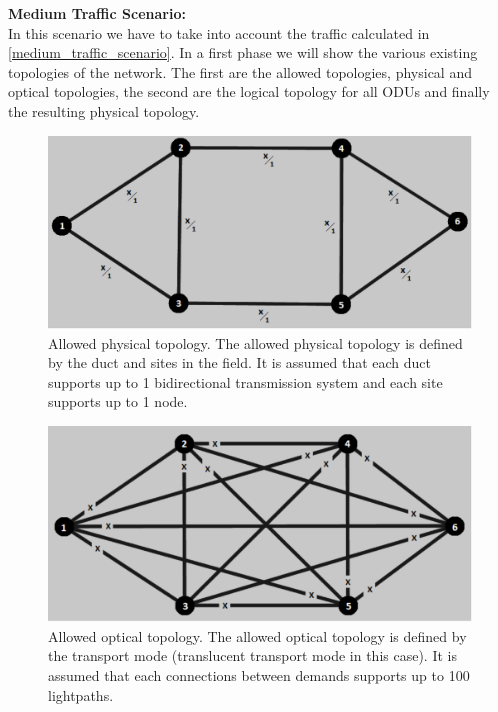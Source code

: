 \noindent
\textbf{Medium Traffic Scenario:}\\

In this scenario we have to take into account the traffic calculated in \ref{medium_traffic_scenario}. In a first phase we will show the various existing topologies of the network. The first are the allowed topologies, physical and optical topologies, the second are the logical topology for all ODUs and finally the resulting physical topology.\\

\begin{figure}[H]
\centering
\includegraphics[width=13cm]{sdf/heuristic/translucent_protection/figures/allowed_physical}
\caption{Allowed physical topology. The allowed physical topology is defined by the duct and sites in the field. It is assumed that each duct supports up to 1 bidirectional transmission system and each site supports up to 1 node.}
\label{allowed_physical_protec_ref_medium_heuristic_translucent}
\end{figure}

\begin{figure}[H]
\centering
\includegraphics[width=13cm]{sdf/heuristic/translucent_protection/figures/allowed_optical}
\caption{Allowed optical topology. The allowed optical topology is defined by the transport mode (translucent transport mode in this case). It is assumed that each connections between demands supports up to 100 lightpaths.}
\label{allowed_optical_protec_ref_medium_heuristic_translucent}
\end{figure}

